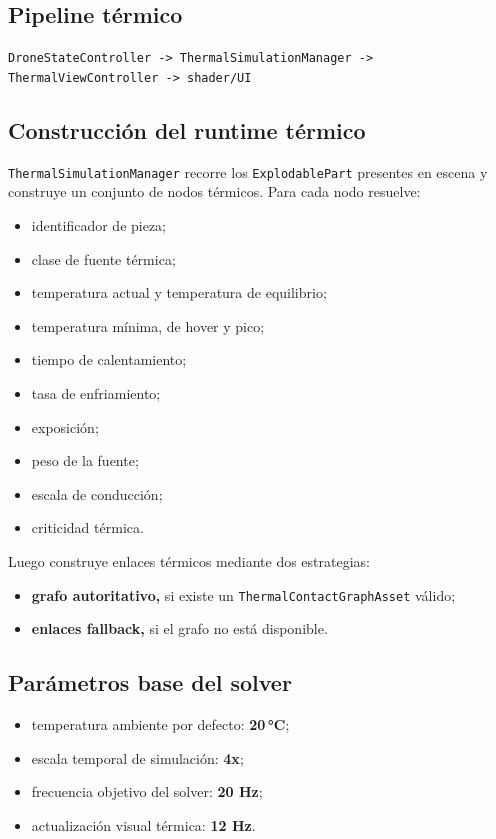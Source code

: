 \documentclass[12pt,letterpaper]{article}
\begin{document}
\subsection{Pipeline térmico}
\begin{center}
\texttt{DroneStateController -> ThermalSimulationManager -> ThermalViewController -> shader/UI}
\end{center}

\subsection{Construcción del runtime térmico}
\texttt{ThermalSimulationManager} recorre los \texttt{ExplodablePart} presentes en escena y construye un conjunto de nodos térmicos. Para cada nodo resuelve:
\begin{itemize}
    \item identificador de pieza;
    \item clase de fuente térmica;
    \item temperatura actual y temperatura de equilibrio;
    \item temperatura mínima, de hover y pico;
    \item tiempo de calentamiento;
    \item tasa de enfriamiento;
    \item exposición;
    \item peso de la fuente;
    \item escala de conducción;
    \item criticidad térmica.
\end{itemize}

\noindent Luego construye enlaces térmicos mediante dos estrategias:
\begin{itemize}
    \item \textbf{grafo autoritativo,} si existe un \texttt{ThermalContactGraphAsset} válido;
    \item \textbf{enlaces fallback,} si el grafo no está disponible.
\end{itemize}

\subsection{Parámetros base del solver}
\begin{itemize}
    \item temperatura ambiente por defecto: \textbf{20\,°C};
    \item escala temporal de simulación: \textbf{4x};
    \item frecuencia objetivo del solver: \textbf{20 Hz};
    \item actualización visual térmica: \textbf{12 Hz}.
\end{itemize}
\end{document}
